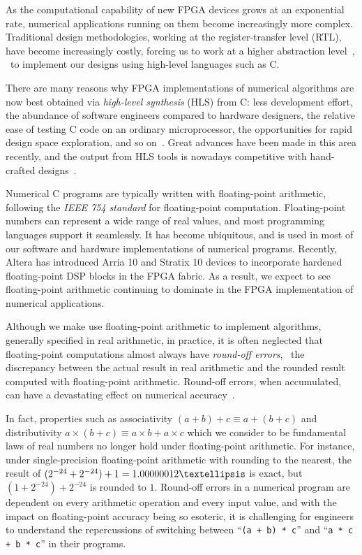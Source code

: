 As the computational capability of new FPGA devices grows at an exponential
rate, numerical applications running on them become increasingly more complex.
Traditional design methodologies, working at the register-transfer level (RTL),
have become increasingly costly, forcing us to work at a higher abstraction
level~\cite{gajski}, \ie~to implement our designs using high-level languages
such as C\@.

There are many reasons why FPGA implementations of numerical algorithms
are now best obtained via \emph{high-level synthesis} (HLS) from C\@:
less development effort, the abundance of software engineers compared to
hardware designers, the relative ease of testing C code on an ordinary
microprocessor, the opportunities for rapid design space exploration, and
so on~\cite{meeus12}. Great advances have been made in this area recently,
and the output from HLS tools is nowadays competitive with hand-crafted
designs~\cite{bdti_xilinx}.

Numerical C programs are typically written with floating-point arithmetic,
following the \emph{IEEE 754 standard} for floating-point computation.
Floating-point numbers can represent a wide range of real values, and most
programming languages support it seamlessly.  It has become ubiquitous, and
is used in most of our software and hardware implementations of numerical
programs.  Recently, Altera has introduced Arria 10 and Stratix 10 devices
to incorporate hardened floating-point DSP blocks in the FPGA fabric.  As a
result, we expect to see floating-point arithmetic continuing to dominate in
the FPGA implementation of numerical applications.

Although we make use floating-point arithmetic to implement algorithms,
generally specified in real arithmetic, in practice, it is often neglected that
floating-point computations almost always have \emph{round-off errors}, \ie~the
discrepancy between the actual result in real arithmetic and the rounded result
computed with floating-point arithmetic.  Round-off errors, when accumulated,
can have a devastating effect on numerical accuracy~\cite{higham02}.

In fact, properties such as associativity $(a + b) + c \equiv a + (b + c)$
and distributivity $a \times (b + c) \equiv a \times b + a \times c$ which
we consider to be fundamental laws of real numbers no longer hold under
floating-point arithmetic.  For instance, under single-precision floating-point
arithmetic with rounding to the nearest, the result of $(2^{-24} + 2^{-24})
+ 1 = 1.00000012\textellipsis$ is exact, but $(1 + 2^{-24}) + 2^{-24}$ is
rounded to $1$.  Round-off errors in a numerical program are dependent on
every arithmetic operation and every input value, and with the impact on
floating-point accuracy being so esoteric, it is challenging for engineers to
understand the repercussions of switching between ``\verb|(a + b) * c|'' and
``\verb|a * c + b * c|'' in their programs.

